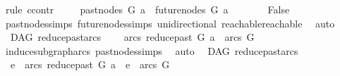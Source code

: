 \begin{isabellebody}
%
\isadelimproof
%
\endisadelimproof
%
\isatagproof
{}\isamarkupfalse%
\ {\isacharparenleft}{\kern0pt}rule\ ccontr{\isacharparenright}{\kern0pt}\isanewline
\ \ \isamarkupfalse%
\ {\isachardoublequoteopen}{\isasymnot}\ past{\isacharunderscore}{\kern0pt}nodes\ G\ a\ {\isasyminter}\ future{\isacharunderscore}{\kern0pt}nodes\ G\ a\ {\isacharequal}{\kern0pt}\ {\isacharbraceleft}{\kern0pt}{\isacharbraceright}{\kern0pt}{\isachardoublequoteclose}\isanewline
\ \ \isamarkupfalse%
\ \isamarkupfalse%
\ False\isanewline
\ \ \ \ \isamarkupfalse%
\ past{\isacharunderscore}{\kern0pt}nodes{\isachardot}{\kern0pt}simps\ future{\isacharunderscore}{\kern0pt}nodes{\isachardot}{\kern0pt}simps\ unidirectional\ reachable{}{\isacharunderscore}{\kern0pt}reachable\ \isamarkupfalse%
\ auto\isanewline
{}\isamarkupfalse%
%
\endisatagproof
{\isafoldproof}%
%
\isadelimproof
%
\endisadelimproof
%
\isadelimdocument
%
\endisadelimdocument
%
\isatagdocument
%
\isamarkuptrue%
%
\endisatagdocument
{\isafolddocument}%
%
\isadelimdocument
%
\endisadelimdocument
{}\isamarkupfalse%
\ {\isacharparenleft}{\kern0pt}\ DAG{\isacharparenright}{\kern0pt}\ reduce{\isacharunderscore}{\kern0pt}past{\isacharunderscore}{\kern0pt}arcs{\isacharcolon}{\kern0pt}\ \isanewline
\ \ \ {\isachardoublequoteopen}arcs\ {\isacharparenleft}{\kern0pt}reduce{\isacharunderscore}{\kern0pt}past\ G\ a{\isacharparenright}{\kern0pt}\ {\isasymsubseteq}\ arcs\ G{\isachardoublequoteclose}\isanewline
%
\isadelimproof
\ \ %
\endisadelimproof
%
\isatagproof
{}\isamarkupfalse%
\ induce{\isacharunderscore}{\kern0pt}subgraph{\isacharunderscore}{\kern0pt}arcs\ past{\isacharunderscore}{\kern0pt}nodes{\isachardot}{\kern0pt}simps\ \isamarkupfalse%
\ auto%
\endisatagproof
{\isafoldproof}%
%
\isadelimproof
\isanewline
%
\endisadelimproof
\isanewline
{}\isamarkupfalse%
\ {\isacharparenleft}{\kern0pt}\ DAG{\isacharparenright}{\kern0pt}\ reduce{\isacharunderscore}{\kern0pt}past{\isacharunderscore}{\kern0pt}arcs{}{\isacharcolon}{\kern0pt}\isanewline
\ \ {\isachardoublequoteopen}e\ {\isasymin}\ arcs\ {\isacharparenleft}{\kern0pt}reduce{\isacharunderscore}{\kern0pt}past\ G\ a{\isacharparenright}{\kern0pt}\ {\isasymLongrightarrow}\ e\ {\isasymin}\ arcs\ G{\isachardoublequoteclose}\isanewline
%
\isadelimproof
\ \ %
\endisadelimproof
%
\isatagproof
{}\isamarkupfalse%

\end{isabellebody}
